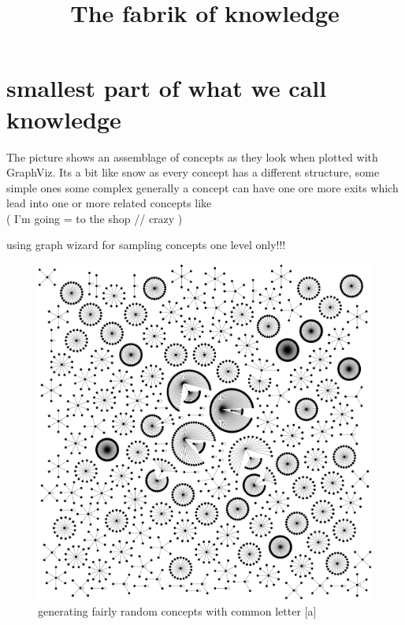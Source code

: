 \documentclass[11pt]{article}
\title{\textbf{The fabrik of knowledge}}
\begin{document}
\maketitle


\section{smallest part of what we call knowledge}
The picture shows an assemblage of concepts as they look when plotted with GraphViz.
Its a bit like snow as every concept has a different structure,
some simple ones some complex generally a concept can have one ore more 
exits which lead into one or more related concepts like\\
( I'm going = to the shop // crazy )

using graph wizard for sampling concepts one level only!!!


\begin{figure}[htp]
\includegraphics[scale=0.14]{img/a_directories.png}
\caption{generating fairly random concepts with common letter [a] }
\label{}
\end{figure}
\end{document}
